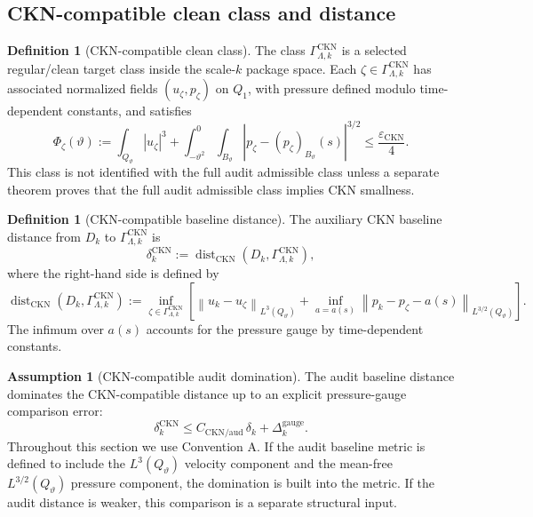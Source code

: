 \documentclass[11pt]{article}
\numberwithin{equation}{section}
\theoremstyle{plain}
\theoremstyle{definition}
\newtheorem{definition}[theorem]{Definition}
\newtheorem{assumption}[theorem]{Assumption}
\theoremstyle{remark}
\newcommand{\Dist}{\operatorname{dist}}
\newcommand{\norm}[1]{\left\lVert #1\right\rVert}
\begin{document}
\subsection{CKN-compatible clean class and distance}

\begin{definition}[CKN-compatible clean class]\label{def:ckn-clean-class}
The class \(\Gamma_{\Lambda,k}^{\mathrm{CKN}}\) is a selected regular/clean
target class inside the scale-\(k\) package space.  Each
\(\zeta\in\Gamma_{\Lambda,k}^{\mathrm{CKN}}\) has associated normalized fields
\((u_\zeta,p_\zeta)\) on \(Q_1\), with pressure defined modulo
time-dependent constants, and satisfies
\[
  \Phi_\zeta(\vartheta)
  :=
  \int_{Q_\vartheta}|u_\zeta|^3
  +
  \int_{-\vartheta^2}^{0}\int_{B_\vartheta}
  |p_\zeta-(p_\zeta)_{B_\vartheta}(s)|^{3/2}
  \le
  \frac{\varepsilon_{\mathrm{CKN}}}{4}.
\]
This class is not identified with the full audit admissible class unless a
separate theorem proves that the full audit admissible class implies CKN
smallness.
\end{definition}

\begin{definition}[CKN-compatible baseline distance]\label{def:ckn-distance}
The auxiliary CKN baseline distance from \(D_k\) to
\(\Gamma_{\Lambda,k}^{\mathrm{CKN}}\) is
\[
  \delta_k^{\mathrm{CKN}}
  :=
  \Dist_{\mathrm{CKN}}
  (D_k,\Gamma_{\Lambda,k}^{\mathrm{CKN}}),
\]
where the right-hand side is defined by
\[
  \Dist_{\mathrm{CKN}}
  (D_k,\Gamma_{\Lambda,k}^{\mathrm{CKN}})
  :=
  \inf_{\zeta\in\Gamma_{\Lambda,k}^{\mathrm{CKN}}}
  \left[
  \norm{u_k-u_\zeta}_{L^3(Q_\vartheta)}
  +
  \inf_{a=a(s)}
  \norm{p_k-p_\zeta-a(s)}_{L^{3/2}(Q_\vartheta)}
  \right].
\]
The infimum over \(a(s)\) accounts for the pressure gauge by time-dependent
constants.
\end{definition}

\begin{assumption}[CKN-compatible audit domination]\label{ass:ckn-audit-domination}
The audit baseline distance dominates the CKN-compatible distance up to an
explicit pressure-gauge comparison error:
\[
  \delta_k^{\mathrm{CKN}}
  \le
  C_{\mathrm{CKN/aud}}\,\delta_k
  +
  \Delta_k^{\mathrm{gauge}}.
\]
Throughout this section we use Convention A.  If the audit baseline metric
is defined to include the \(L^3(Q_\vartheta)\) velocity component and the
mean-free \(L^{3/2}(Q_\vartheta)\) pressure component, the domination is built
into the metric.  If the audit distance is weaker, this comparison is a
separate structural input.
\end{assumption}
\end{document}
